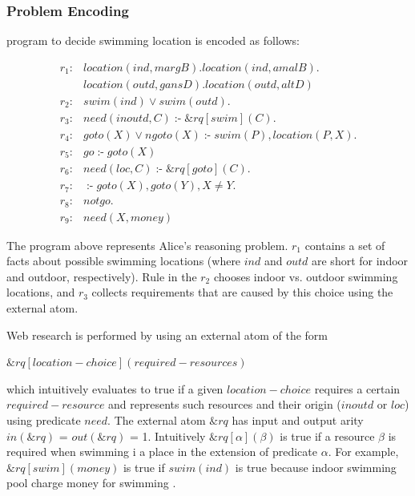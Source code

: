 \documentclass[14pt,a4paper, titlepage]{article}
\newcommand{\ext}[3]{\ensuremath{\&{#1}[#2](#3)}}
\DeclareMathOperator{\leftimpl}{:-}
\begin{document}
\subsubsection{Problem Encoding}
\hex{} program to decide swimming location is encoded as follows:
\begin{exmp}
\label{swimExample}
\begin{align*}
r_1\colon& location(ind, margB). location(ind, amalB). \\& location(outd, gansD). location(outd, altD) \\  
r_2\colon& swim(ind) \vee swim(outd).\\ 
r_3\colon& need(inoutd, C) \leftimpl \ext{\mathit{rq}}{\mathit{swim}}{\mathit{C}}. \\
r_4\colon& goto(X) \vee ngoto(X) \leftimpl swim(P), location(P, X).\\
r_5\colon& go \leftimpl goto(X)\\
r_6\colon& \mathit{need}(loc, C) \leftimpl \ext{\mathit{rq}}{\mathit{goto}}{\mathit{C}}. \\ 
r_7\colon& \leftimpl goto(X), goto(Y), X \neq Y. \\
r_8\colon& not go. \\
r_9\colon& need(X, money)
\end{align*}
\end{exmp}
The \hex{} program above represents Alice's reasoning problem. $r_1$ contains a set of facts about possible swimming locations (where $\mathit{ind}$ and $\mathit{outd}$ are short for indoor and outdoor, respectively). Rule in the $r_2$ chooses indoor vs. outdoor swimming locations, and $r_3$ collects requirements that are caused by this choice using the external atom. 

Web research is performed by using an external atom of the form\\ \centerline{$\ext{\mathit{rq}}{\mathit{location-choice}}{\mathit{required-resources}}$} which intuitively evaluates to true if a given $\mathit{location-choice}$ requires a certain $\mathit{required-resource}$ and represents such resources  and their origin ($\mathit{inoutd}$ or $\mathit{loc}$) using predicate $\mathit{need}$. The external atom $\mathit{\&rq}$ has input and output arity $\mathit{in(\&rq)}$ = $\mathit{out(\&rq)}$ = 1. Intuitively  $\ext{\mathit{rq}}{\mathit{\alpha}}{\mathit{\beta}}$ is true if a resource $\beta$ is required when swimming i a place in the extension of predicate $\alpha$. For example, $\ext{\mathit{rq}}{\mathit{swim}}{\mathit{money}}$ is true if $\mathit{swim(ind)}$ is true because indoor swimming pool charge money for swimming \cite{swim}. 
\end{document}
